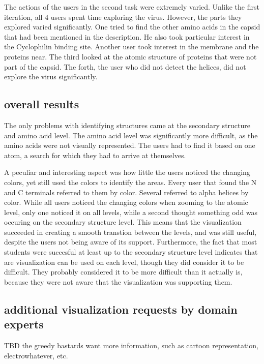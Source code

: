 \documentclass[review,journal]{vgtc}         %
\begin{document}
The actions of the users in the second task were extremely varied. Unlike the first iteration, all 4 users spent time exploring the virus. However, the parts they explored varied significantly. One tried to find the other amino acids in the capsid that had been mentioned in the description. He also took particular interest in the Cyclophilin binding site. Another user took interest in the membrane and the proteins near. The third looked at the atomic structure of proteins that were not part of the capsid. The forth, the user who did not detect the helices, did not explore the virus significantly.



\subsection{overall results}
The only problems with identifying structures came at the secondary structure and amino acid level. The amino acid level was significantly more difficult, as the amino acids were not visually represented. The users had to find it based on one atom, a search for which they had to arrive at themselves. 

A peculiar and interesting aspect was how little the users noticed the changing colors, yet still used the colors to identify the areas. Every user that found the N and C terminals referred to them by color. Several referred to alpha helices by color. While all users noticed the changing colors when zooming to the atomic level, only one noticed it on all levels, while a second thought something odd was occuring on the secondary structure level. This means that the visualization succeeded in creating a smooth transtion between the levels, and was still useful, despite the users not being aware of its support. Furthermore, the fact that most students were succesful at least up to the secondary structure level indicates that are visualization can be used on each level, though they did consider it to be difficult. They probably considered it to be more difficult than it actually is, because they were not aware that the visualization was supporting them.


\subsection{additional visualization requests by domain experts}
TBD
the greedy bastards want more information, such as cartoon representation, electrowhatever, etc.
\end{document}
